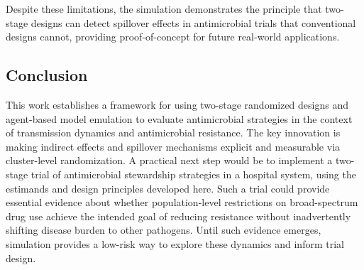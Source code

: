 Despite these limitations, the simulation demonstrates the principle that two-stage designs can detect
spillover effects in antimicrobial trials that conventional designs cannot, providing proof-of-concept
for future real-world applications.

\subsection{Conclusion}

This work establishes a framework for using two-stage randomized designs and agent-based model emulation
to evaluate antimicrobial strategies in the context of transmission dynamics and antimicrobial resistance.
The key innovation is making indirect effects and spillover mechanisms explicit and measurable via cluster-level
randomization. A practical next step would be to implement a two-stage trial of antimicrobial stewardship
strategies in a hospital system, using the estimands and design principles developed here. Such a trial could
provide essential evidence about whether population-level restrictions on broad-spectrum drug use achieve the
intended goal of reducing resistance without inadvertently shifting disease burden to other pathogens. Until
such evidence emerges, simulation provides a low-risk way to explore these dynamics and inform trial design.


